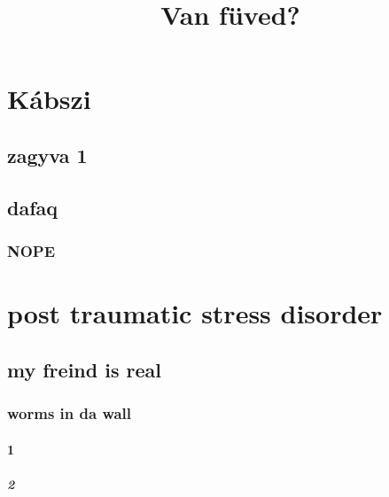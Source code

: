 \documentclass{article}
\title{Van füved?}
\begin{document}
\maketitle
\setcounter{secnumdepth}{10}
\setcounter{tocdepth}{10}
\renewcommand{\contentsname}{MI FOLYIK ITT GYÖNGYÖSÖN!?}
\tableofcontents
\clearpage
{}
\section{Kábszi}
\subsection{zagyva 1}
\hulipsum[3]
\subsection{dafaq}
\hulipsum[4]
\subsubsection{NOPE}
\hulipsum[1]
\section[ptsd]{post traumatic stress disorder}
\subsection{my freind is real}
\subsubsection{worms in da wall}
\paragraph{1}
\subparagraph{2}
\hulipsum[2]
\tableofcontents
\end{document}
